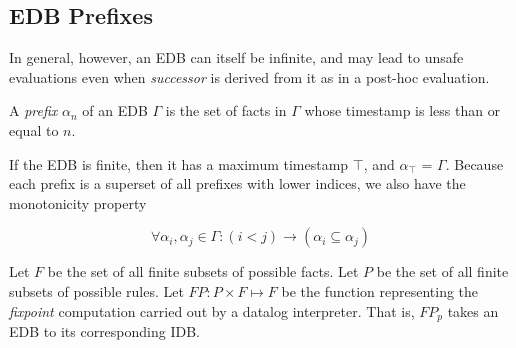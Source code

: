 



\subsection{EDB Prefixes}

In general, however, an EDB can itself be infinite, and may lead to unsafe evaluations even when \emph{successor} is derived from it
as in a post-hoc evaluation.

\begin{definition}
A \emph{prefix} $\alpha_{n}$ of an EDB $\Gamma$ is the set of facts in $\Gamma$ whose timestamp is less than or equal to $n$.
\end{definition}

If the EDB is finite, then it has a maximum timestamp $\top$, and $\alpha_{\top}$ = $\Gamma$.  Because each prefix is a superset of all 
prefixes with lower indices, we also have the monotonicity property

\begin{equation}
\forall \alpha_{i}, \alpha_{j} \in \Gamma : (i < j) \to (\alpha_{i} \subseteq \alpha_{j})
\end{equation}



\begin{definition}
Let $F$ be the set of all finite subsets of possible facts.   
Let $P$ be the set of all finite subsets of possible rules.
Let $FP : P \times F \mapsto F$ be the function representing the
\emph{fixpoint} computation carried out by a datalog interpreter.  That is, $FP_p$ takes an EDB to its corresponding IDB.
\end{definition}



